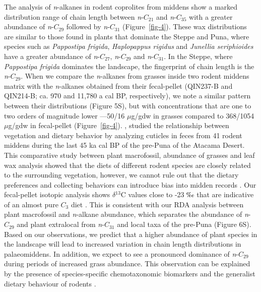 \documentclass[
  authoryear,
  preprint,
  3p]{elsarticle}
\begin{document}
The analysis of \emph{n}-alkanes in rodent coprolites from middens show
a marked distribution range of chain length between \emph{n}-\(C_{21}\)
and \emph{n}-\(C_{35}\) with a greater abundance of \emph{n}-\(C_{29}\)
followed by \emph{n}-\(C_{31}\) (Figure~\ref{fig-4}). These wax
distributions are similar to those found in plants that dominate the
Steppe and Puna, where species such as \emph{Pappostipa frigida},
\emph{Haplopappus rigidus} and \emph{Junellia seriphioides} have a
greater abundance of \emph{n}-\(C_{27}\), \emph{n}-\(C_{29}\) and
\emph{n}-\(C_{31}\). In the Steppe, where \emph{Pappostipa frigida}
dominates the landscape, the fingerprint of chain length is the
\emph{n}-\(C_{29}\). When we compare the \emph{n}-alkanes from grasses
inside two rodent middens matrix with the \emph{n}-alkanes obtained from
their fecal-pellet (QIN237-B and QIN214-B; ca. 970 and 11,780 a cal BP,
respectively), we note a similar pattern between their distributions
(Figure 5S), but with concentrations that are one to two orders of
magnitude lower ---50/16 \(\mu\)g/gdw in grasses compared to 368/1054
\(\mu\)g/gdw in fecal-pellet (Figure~\ref{fig-4}).
\citet{latorreVegetationInvasionsAbsolute2002}, studied the relationship
between vegetation and dietary behavior by analyzing cuticles in feces
from 41 rodent middens during the last 45 ka cal BP of the pre-Puna of
the Atacama Desert. This comparative study between plant macrofossil,
abundance of grasses and leaf wax analysis showed that the diets of
different rodent species are closely related to the surrounding
vegetation, however, we cannot rule out that the dietary preferences and
collecting behaviors can introduce bias into midden records
\citep{borrelliDietaryModificationsPackrats2016}. Our fecal-pellet
isotopic analysis shows \(\delta\)\(^{13}\)C values close to -23
\(\text{\textperthousand}\) that are indicative of an almost pure
\(C_{3}\) diet \citep{latorreVegetationInvasionsAbsolute2002}. This is
consistent with our RDA analysis between plant macrofossil and
\emph{n}-alkane abundance, which separates the abundance of
\emph{n}-\(C_{29}\) and plant extralocal from \emph{n}-\(C_{31}\) and
local taxa of the pre-Puna (Figure 6S). Based on our observations, we
predict that a higher abundance of plant species in the landscape will
lead to increased variation in chain length distributions in
palaeomiddens. In addition, we expect to see a pronounced dominance of
\emph{n}-\(C_{29}\) during periods of increased grass abundance. This
observation can be explained by the presence of species-specific
chemotaxonomic biomarkers and the generalist dietary behaviour of
rodents
\citep{latorreVegetationInvasionsAbsolute2002, borrelliDietaryModificationsPackrats2016}.
\end{document}

